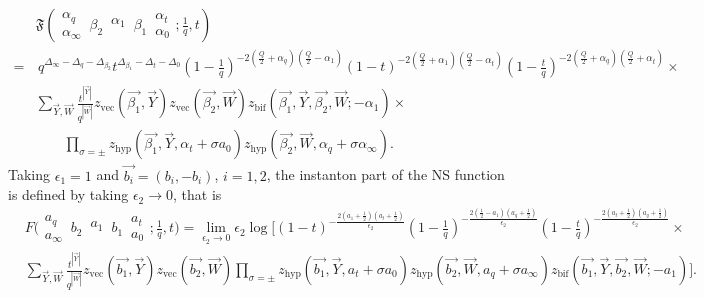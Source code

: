 \documentclass[11pt]{article}
\numberwithin{equation}{section}
\newcommand{\FIVc}[9]{F\bigg( \begin{matrix} #2 \\ #1 \end{matrix} \, #3 \, \begin{matrix} #4  \\ \, \end{matrix} \,#5 \, \begin{matrix} #6 \\ #7 \end{matrix} ; #8, #9 \bigg)}
\begin{document}
\begin{equation}
\begin{aligned}\label{eq:nekfunction}
&\mathfrak{F}\left(\begin{matrix}\alpha_q\\ \alpha_{\infty}\end{matrix}\,\beta_2\,\begin{matrix}\alpha_1\\ {}\end{matrix}\,\beta_1\,\begin{matrix}\alpha_t\\ \alpha_{0}\end{matrix};\frac{1}{q},t\right)\\
=&\,q^{\Delta_{\infty}-\Delta_q-\Delta_{\beta_2}} t^{\Delta_{\beta_1} - \Delta_t - \Delta_{0}}\left(1-\frac{1}{q}\right)^{-2\left(\frac{Q}{2}+\alpha_q\right)\left(\frac{Q}{2}-\alpha_1\right)}(1-t)^{-2\left(\frac{Q}{2}+ \alpha_1\right)\left(\frac{Q}{2}-\alpha_t\right)}\left(1-\frac{t}{q}\right)^{-2\left(\frac{Q}{2}+\alpha_q\right)\left(\frac{Q}{2}+\alpha_t\right)} \times\\
&\sum_{\vec{Y},\vec{W}} \frac{t^{| \vec{Y} |}}{q^{|\vec{W}|}} z_{\text{vec}} \left( \vec{\beta_1}, \vec{Y} \right)z_{\text{vec}} \left( \vec{\beta_2}, \vec{W} \right) z_{\text{bif}} \left( \vec{\beta_1},\vec{Y},\vec{\beta_2},\vec{W};-\alpha_1 \right)\times\\
&\qquad\prod_{\sigma = \pm}  z_{\text{hyp}} \left( \vec{\beta_1}, \vec{Y}, \alpha_t + \sigma a_0 \right) z_{\text{hyp}} \left( \vec{\beta_2}, \vec{W}, \alpha_{q} + \sigma \alpha_{\infty} \right).
\end{aligned}
\end{equation}
%
Taking $\epsilon_1=1$ and $\vec{b_i}=(b_i,-b_i)$, $i=1,2$, the instanton part of the NS function is defined by  taking $\epsilon_2\to 0$, that is
\begin{equation}\label{FNS}
\begin{aligned}
&\FIVc{a_{\infty}}{a_{q}}{b_2}{a_1}{b_1}{a_t}{a_0}{\frac{1}{q}}{t}=\lim_{\epsilon_2\to 0}\epsilon_2\log\Biggl[(1-t)^{-\frac{2 \left(a_1+\frac{1}{2}\right) \left(a_t+\frac{1}{2}\right)}{\epsilon_2}} \left(1-\frac{1}{q}\right)^{-\frac{2 \left(\frac{1}{2}-a_1\right) \left(a_{q}+\frac{1}{2}\right)}{\epsilon_2}} \left(1-\frac{t}{q}\right)^{-\frac{2 \left(a_t+\frac{1}{2}\right) \left(a_{q}+\frac{1}{2}\right)}{\epsilon_2}}\times\\
&\sum_{\vec{Y},\vec{W}} \frac{t^{| \vec{Y} |}}{q^{|\vec{W}|}} z_{\text{vec}} \left( \vec{b_1}, \vec{Y} \right)z_{\text{vec}} \left( \vec{b_2}, \vec{W} \right) \prod_{\sigma = \pm}  z_{\text{hyp}} \left( \vec{b_1}, \vec{Y}, a_t + \sigma a_0 \right) z_{\text{hyp}} \left( \vec{b_2}, \vec{W}, a_{q} + \sigma a_{\infty} \right) z_{\text{bif}} \left( \vec{b_1},\vec{Y},\vec{b_2},\vec{W};-a_1 \right)\Biggr].
\end{aligned}
\end{equation}
\end{document}

